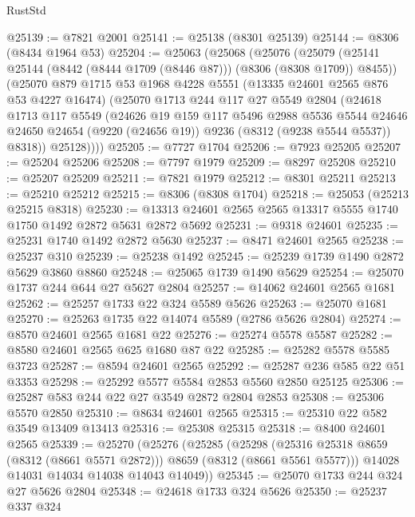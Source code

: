 \begin{lexlean}{RustStd}
\begin{coremodule}
@25139 := @7821 @2001
@25141 := @25138 (@8301 @25139)
@25144 := @8306 (@8434 @1964 @53)
@25204 := @25063
    (@25068
      (@25076
        (@25079 (@25141 @25144 (@8442 (@8444 @1709 (@8446 @87))) (@8306 (@8308 @1709)) @8455))
        (@25070
          @879
          @1715
          @53
          @1968
          @4228
          @5551
          (@13335 @24601 @2565 @876 @53 @4227 @16474)
          (@25070
            @1713
            @244
            @117
            @27
            @5549
            @2804
            (@24618
              @1713
              @117
              @5549
              (@24626
                @19
                @159
                @117
                @5496
                @2988
                @5536
                @5544
                @24646
                @24650
                @24654
                (@9220 (@24656 @19))
                @9236
                (@8312 (@9238 @5544 @5537))
                @8318))
            @25128))))
@25205 := @7727 @1704
@25206 := @7923 @25205
@25207 := @25204 @25206
@25208 := @7797 @1979
@25209 := @8297 @25208
@25210 := @25207 @25209
@25211 := @7821 @1979
@25212 := @8301 @25211
@25213 := @25210 @25212
@25215 := @8306 (@8308 @1704)
@25218 := @25053 (@25213 @25215 @8318)
@25230 := @13313 @24601 @2565 @2565 @13317 @5555 @1740 @1750 @1492 @2872 @5631 @2872 @5692
@25231 := @9318 @24601
@25235 := @25231 @1740 @1492 @2872 @5630
@25237 := @8471 @24601 @2565
@25238 := @25237 @310
@25239 := @25238 @1492
@25245 := @25239 @1739 @1490 @2872 @5629 @3860 @8860
@25248 := @25065 @1739 @1490 @5629
@25254 := @25070 @1737 @244 @644 @27 @5627 @2804
@25257 := @14062 @24601 @2565 @1681
@25262 := @25257 @1733 @22 @324 @5589 @5626
@25263 := @25070 @1681
@25270 := @25263 @1735 @22 @14074 @5589 (@2786 @5626 @2804)
@25274 := @8570 @24601 @2565 @1681 @22
@25276 := @25274 @5578 @5587
@25282 := @8580 @24601 @2565 @625 @1680 @87 @22
@25285 := @25282 @5578 @5585 @3723
@25287 := @8594 @24601 @2565
@25292 := @25287 @236 @585 @22 @51 @3353
@25298 := @25292 @5577 @5584 @2853 @5560 @2850 @25125
@25306 := @25287 @583 @244 @22 @27 @3549 @2872 @2804 @2853
@25308 := @25306 @5570 @2850
@25310 := @8634 @24601 @2565
@25315 := @25310 @22 @582 @3549 @13409 @13413
@25316 := @25308 @25315
@25318 := @8400 @24601 @2565
@25339 := @25270
    (@25276
      (@25285
        (@25298 (@25316 @25318 @8659 (@8312 (@8661 @5571 @2872))) @8659 (@8312 (@8661 @5561 @5577)))
        @14028
        @14031
        @14034
        @14038
        @14043
        @14049))
@25345 := @25070 @1733 @244 @324 @27 @5626 @2804
@25348 := @24618 @1733 @324 @5626
@25350 := @25237 @337 @324

\end{coremodule}
\end{lexlean}
